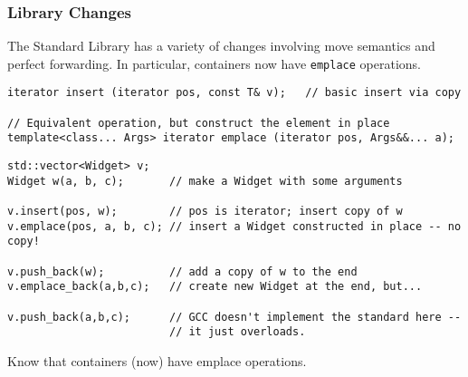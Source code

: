 
\begin{frame}[fragile]
\frametitle{Library Changes}
The Standard Library has a variety of changes involving move semantics
and perfect forwarding.  In particular, containers now
have \texttt{emplace} operations.
{\scriptsize
\begin{verbatim}
iterator insert (iterator pos, const T& v);   // basic insert via copy

// Equivalent operation, but construct the element in place
template<class... Args> iterator emplace (iterator pos, Args&&... a); 
\end{verbatim}}
\pause
{\scriptsize \begin{verbatim}
std::vector<Widget> v;
Widget w(a, b, c);       // make a Widget with some arguments

v.insert(pos, w);        // pos is iterator; insert copy of w
v.emplace(pos, a, b, c); // insert a Widget constructed in place -- no copy!

v.push_back(w);          // add a copy of w to the end
v.emplace_back(a,b,c);   // create new Widget at the end, but...

v.push_back(a,b,c);      // GCC doesn't implement the standard here --
                         // it just overloads.
\end{verbatim}
}
\pause
\begin{center}
Know that containers (now) have emplace operations.
\end{center}

\end{frame}



